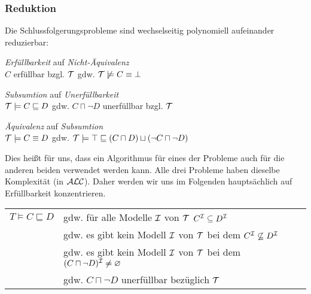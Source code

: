\subsubsection{Reduktion}

Die Schlussfolgerungsprobleme sind wechselseitig polynomiell aufeinander reduzierbar:

\begin{lemma}\mbox{}\label{lem:problem-reduction}
\begin{enumerate}
\item{\emph{Erfüllbarkeit} auf \emph{Nicht-Äquivalenz} \\
$C$ erfüllbar bzgl. $\mathcal{T}$ gdw. $\mathcal{T} \not\models C \equiv \bot$}
\item{\emph{Subsumtion} auf \emph{Unerfüllbarkeit} \\
$\mathcal{T} \models C \sqsubseteq D$ gdw. $C \sqcap \neg D$ unerfüllbar bzgl.
$\mathcal{T}$
\item{\emph{Äquivalenz} auf \emph{Subsumtion} \\}
$\mathcal{T} \models C \equiv D$ gdw. $\MT \models \top \sqsubseteq \left( C \sqcap D \right) \sqcup \left( \neg C \sqcap \neg D \right)$}
\end{enumerate}
\end{lemma}

Dies heißt für uns, dass ein Algorithmus für eines der Probleme auch für die
anderen beiden verwendet werden kann. Alle drei Probleme haben dieselbe
Komplexität (in $\mathcal{A}\mathcal{L}\mathcal{C}$). Daher werden wir uns im Folgenden hauptsächlich auf
Erfüllbarkeit konzentrieren.

\begin{tafel}\mbox{}
    \begin{center} \begin{tabular}{ll}
        $T \models C \sqsubseteq D$ & gdw. für alle Modelle $\mathcal{I}$ von $\mathcal{T}$ $C^{\mathcal{I}} \subseteq D^{\mathcal{I}}$\\
                                    & gdw. es gibt kein Modell $\mathcal{I}$ von $\mathcal{T}$ bei dem $C^{\mathcal{I}} \not\subseteq D^{\mathcal{I}}$\\
                                    & gdw. es gibt kein Modell $\mathcal{I}$ von $\mathcal{T}$ bei dem $(C \sqcap \neg D)^{\mathcal{I}} \neq \varnothing$\\
                                    & gdw. $C \sqcap \neg D$ unerfüllbar bezüglich $\mathcal{T}$\\
    \end{tabular}
\end{center}
\end{tafel}

